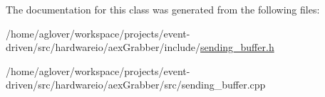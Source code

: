 The documentation for this class was generated from the following files\+:\begin{DoxyCompactItemize}
\item 
/home/aglover/workspace/projects/event-\/driven/src/hardwareio/aex\+Grabber/include/\hyperlink{sending__buffer_8h}{sending\+\_\+buffer.\+h}\item 
/home/aglover/workspace/projects/event-\/driven/src/hardwareio/aex\+Grabber/src/sending\+\_\+buffer.\+cpp\end{DoxyCompactItemize}
